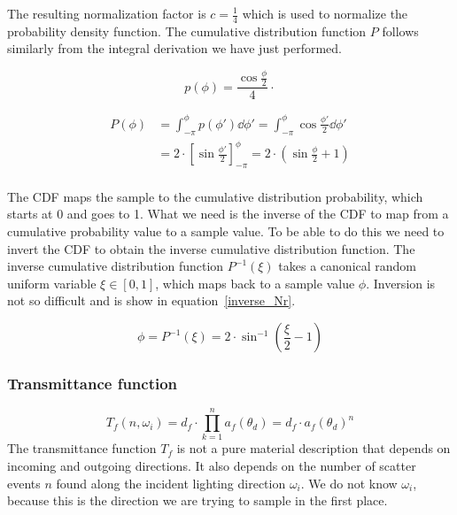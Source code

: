 \documentclass[12pt,a4paper,twoside]{article}
\begin{document}
The resulting normalization factor is $c = \frac{1}{4}$ which is used to normalize the probability density function. The cumulative distribution function $P$ follows similarly from the integral derivation we have just performed.

\begin{equation}
p(\phi) = \frac{ \cos \frac{\phi}{2}}{4} \cdot
\end{equation}

 \begin{align*}
P(\phi) & = \int_{-\pi}^{\phi} p(\phi') \dd{\phi'} = \int_{-\pi}^{\phi} \cos \frac{\phi'}{2} \dd{\phi'} \\
&  = 2 \cdot \left[\sin \frac{\phi'}{2} \right]_{-\pi}^{\phi} = 2 \cdot \left(\sin \frac{\phi}{2} + 1\right) \\
\end{align*}

The CDF maps the sample to the cumulative distribution probability, which starts at 0 and goes to 1. What we need is the inverse of the CDF to map from a cumulative probability value to a sample value. To be able to do this we need to invert the CDF to obtain the inverse cumulative distribution function. The inverse cumulative distribution function $P^{-1}(\xi)$ takes a canonical random uniform variable $\xi \in [0, 1]$, which maps back to a sample value $\phi$. Inversion is not so difficult and is show in equation~\ref{inverse_Nr}.

\begin{equation}
\phi = P^{-1}(\xi) = 2 \cdot \sin^{-1} \left( \frac{\xi}{2} - 1\right)
\end{equation}

\subsubsection*{Transmittance function}
\begin{equation}
T_f(n, \omega_i) = d_f \cdot \prod_{k=1}^{n} a_f(\theta_d) = d_f \cdot a_f(\theta_d)^n
\end{equation}
The transmittance function $T_f$ is not a pure material description that depends on incoming and outgoing directions. It also depends on the number of scatter events $n$ found along the incident lighting direction $\omega_i$. We do not know $\omega_i$, because this is the direction we are trying to sample in the first place.
\end{document}

